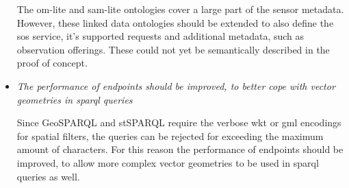 \begin{itemize}
	The om-lite and sam-lite ontologies cover a large part of the sensor metadata. However, these linked data ontologies should be extended to also define the \ac{sos} service, it's supported requests and additional metadata, such as observation offerings. These could not yet be semantically described in the proof of concept.
	
	
	\item \textit{The performance of endpoints should be improved, to better cope with vector geometries in \ac{sparql} queries}
	
	Since GeoSPARQL and stSPARQL require the verbose \ac{wkt} or \ac{gml} encodings for spatial filters, the queries can be rejected for exceeding the maximum amount of characters. For this reason the performance of endpoints should be improved, to allow more complex vector geometries to be used in \ac{sparql} queries as well. 
	
\end{itemize}




